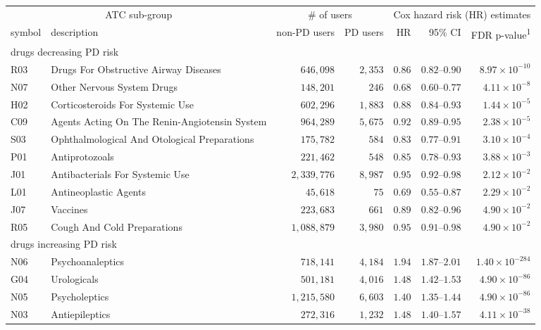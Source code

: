 \setlength{\LTpost}{0mm}
\begin{longtable}{llrrrrr}
\toprule
\multicolumn{2}{c}{ATC sub-group} & \multicolumn{2}{c}{\# of users} & \multicolumn{3}{c}{Cox hazard risk (HR) estimates} \\ 
\cmidrule(lr){1-2} \cmidrule(lr){3-4} \cmidrule(lr){5-7}
symbol & description & non-PD users & PD users & HR & 95\% CI & FDR p-value\textsuperscript{1} \\ 
\midrule
\multicolumn{7}{l}{drugs decreasing PD risk} \\ 
\midrule
R03 & Drugs For Obstructive Airway Diseases & $646,098$ & $2,353$ & $0.86$ & $0.82$–$0.90$ & $8.97 \times 10^{-10}$ \\ 
N07 & Other Nervous System Drugs & $148,201$ & $246$ & $0.68$ & $0.60$–$0.77$ & $4.11 \times 10^{-8}$ \\ 
H02 & Corticosteroids For Systemic Use & $602,296$ & $1,883$ & $0.88$ & $0.84$–$0.93$ & $1.44 \times 10^{-5}$ \\ 
C09 & Agents Acting On The Renin-Angiotensin System & $964,289$ & $5,675$ & $0.92$ & $0.89$–$0.95$ & $2.38 \times 10^{-5}$ \\ 
S03 & Ophthalmological And Otological Preparations & $175,782$ & $584$ & $0.83$ & $0.77$–$0.91$ & $3.10 \times 10^{-4}$ \\ 
P01 & Antiprotozoals & $221,462$ & $548$ & $0.85$ & $0.78$–$0.93$ & $3.88 \times 10^{-3}$ \\ 
J01 & Antibacterials For Systemic Use & $2,339,776$ & $8,987$ & $0.95$ & $0.92$–$0.98$ & $2.12 \times 10^{-2}$ \\ 
L01 & Antineoplastic Agents & $45,618$ & $75$ & $0.69$ & $0.55$–$0.87$ & $2.29 \times 10^{-2}$ \\ 
J07 & Vaccines & $223,683$ & $661$ & $0.89$ & $0.82$–$0.96$ & $4.90 \times 10^{-2}$ \\ 
R05 & Cough And Cold Preparations & $1,088,879$ & $3,980$ & $0.95$ & $0.91$–$0.98$ & $4.90 \times 10^{-2}$ \\ 
\midrule
\multicolumn{7}{l}{drugs increasing PD risk} \\ 
\midrule
N06 & Psychoanaleptics & $718,141$ & $4,184$ & $1.94$ & $1.87$–$2.01$ & $1.40 \times 10^{-284}$ \\ 
G04 & Urologicals & $501,181$ & $4,016$ & $1.48$ & $1.42$–$1.53$ & $4.90 \times 10^{-86}$ \\ 
N05 & Psycholeptics & $1,215,580$ & $6,603$ & $1.40$ & $1.35$–$1.44$ & $4.90 \times 10^{-86}$ \\ 
N03 & Antiepileptics & $272,316$ & $1,232$ & $1.48$ & $1.40$–$1.57$ & $4.11 \times 10^{-38}$ \\ 

\end{longtable}
